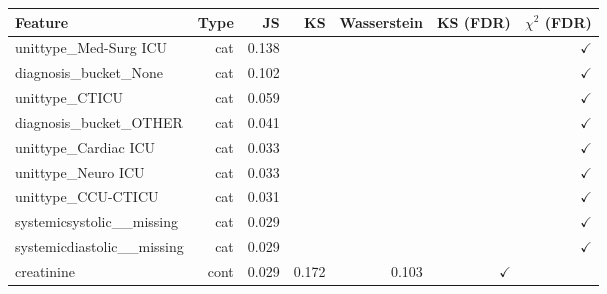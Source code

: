 \begin{tabular}{lrrrrrr}
\toprule
Feature & Type & JS & KS & Wasserstein & KS (FDR) & $\chi^2$ (FDR) \\
\midrule
unittype_Med-Surg ICU & cat & 0.138 &  &  &  & $\checkmark$ \\
diagnosis_bucket_None & cat & 0.102 &  &  &  & $\checkmark$ \\
unittype_CTICU & cat & 0.059 &  &  &  & $\checkmark$ \\
diagnosis_bucket_OTHER & cat & 0.041 &  &  &  & $\checkmark$ \\
unittype_Cardiac ICU & cat & 0.033 &  &  &  & $\checkmark$ \\
unittype_Neuro ICU & cat & 0.033 &  &  &  & $\checkmark$ \\
unittype_CCU-CTICU & cat & 0.031 &  &  &  & $\checkmark$ \\
systemicsystolic__missing & cat & 0.029 &  &  &  & $\checkmark$ \\
systemicdiastolic__missing & cat & 0.029 &  &  &  & $\checkmark$ \\
creatinine & cont & 0.029 & 0.172 & 0.103 & $\checkmark$ &  \\
\bottomrule
\end{tabular}
